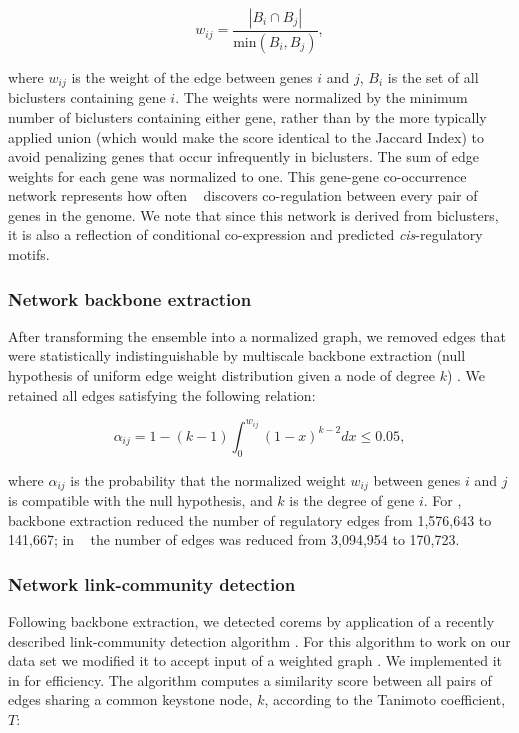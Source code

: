 \begin{equation}
w_{ij} = \frac{\left|B_i\cap B_j\right|}{\mathrm{min}(B_i,B_j)},
\end{equation}

\noindent where $w_{ij}$ is the weight of the edge between genes $i$ and $j$, $B_i$ is the set of all biclusters containing gene $i$. The weights were normalized by the minimum number of biclusters containing either gene, rather than by the more typically applied union (which would make the score identical to the Jaccard Index) to avoid penalizing genes that occur infrequently in biclusters. The sum of edge weights for each gene was normalized to one. This gene-gene co-occurrence network represents how often \cm~ discovers co-regulation between every pair of genes in the genome. We note that since this network is derived from biclusters, it is also a reflection of conditional co-expression and predicted \textit{cis}-­regulatory motifs.

\subsubsection{Network backbone extraction}

After transforming the ensemble into a normalized graph, we removed edges that were statistically indistinguishable by multiscale backbone extraction (null hypothesis of uniform edge weight distribution given a node of degree $k$) \cite{serrano_extracting_2009}. We retained all edges satisfying the following relation:

\begin{equation}
\alpha_{ij}=1-(k-1)\int_0^{w_{ij}}(1-x)^{k-2}dx\leq 0.05,
\end{equation}

\noindent where $\alpha_{ij}$ is the probability that the normalized weight $w_{ij}$ between genes $i$ and $j$ is compatible with the null hypothesis, and $k$ is the degree of gene $i$. For \halo, backbone extraction reduced the number of regulatory edges from 1,576,643 to 141,667; in \eco~ the number of edges was reduced from 3,094,954 to 170,723.

\subsubsection{Network link-community detection}
\label{section:linkcommunity}
Following backbone extraction, we detected corems by application of a recently described link-community detection algorithm \cite{ahn_link_2010}. For this algorithm to work on our data set we modified it to accept input of a weighted graph \cite{kalinka_linkcomm:_2011}. We implemented it in  for efficiency. The algorithm computes a similarity score between all pairs of edges sharing a common keystone node, $k$, according to the Tanimoto coefficient, $T$:

